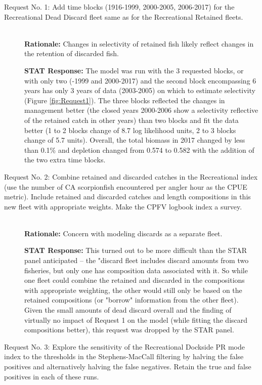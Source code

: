 \documentclass[12pt,]{article}
\begin{document}
\begin{description}

\item[Request No. 1: Add time blocks (1916-1999, 2000-2005, 2006-2017) for the 
  Recreational Dead Discard fleet same as for the Recreational Retained fleets.] \hfill \\
  
\textbf{Rationale:} Changes in selectivity of retained fish likely reflect changes 
in the retention of discarded fish.   
    
\textbf{STAT Response:} The model was run with the 3 requested blocks, or with only 
two (-1999 and 2000-2017) and the second block encompassing 6 years has only 3 years of 
data (2003-2005) on which to estimate selectivity (Figure \ref{fig:Request1}). The three 
blocks reflected the changes in management better (the closed years 2000-2006 show a 
selectivity reflective of the retained catch in other years) than two blocks and fit the data better (1 to 2 blocks 
change of 8.7 log likelihood units, 2 to 3 blocks change of 5.7 units). Overall, the 
total biomass in 2017 changed by less than 0.1\% and depletion changed from 0.574 to 
0.582 with the addition of the two extra time blocks.   


\item[Request No. 2: Combine retained and discarded catches in the Recreational index 
(use the number of CA scorpionfish encountered per angler hour as the CPUE metric).  
Include retained and discarded catches and length compositions in this new fleet with 
appropriate weights.  Make the CPFV logbook index a survey.] \hfill \\


\textbf{Rationale:} Concern with modeling discards as a separate fleet.  


\textbf{STAT Response:} This turned out to be more difficult than the 
STAR panel anticipated – the "discard fleet includes discard amounts from 
two fisheries, but only one has composition data associated with it. So while 
one fleet could combine the retained and discarded in the compositions with 
appropriate weighting, the other would still only be based on the retained 
compositions (or "borrow" information from the other fleet). Given the small 
amounts of dead discard overall and the finding of virtually no impact of Request 
1 on the model (while fitting the discard compositions better), this request was 
dropped by the STAR panel.
    

\item[Request No. 3: Explore the sensitivity of the Recreational Dockside PR mode index 
to the thresholds in the Stephens-MacCall filtering by halving the false positives 
and alternatively halving the false negatives.  Retain the true and false positives 
in each of these runs.] \hfill \\


\end{description}
\end{document}
